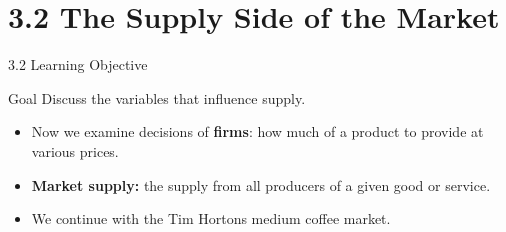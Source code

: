 \documentclass[aspectratio=169]{beamer}
\begin{document}
\section{3.2 The Supply Side of the Market}

\begin{frame}{3.2 Learning Objective}
\transfade
\begin{block}{Goal}
Discuss the variables that influence supply.
\end{block}
\begin{itemize}
  \item Now we examine decisions of \textbf{firms}: how much of a product to provide at various prices.
  \item \textbf{Market supply:} the supply from all producers of a given good or service.
  \item We continue with the Tim Hortons medium coffee market.
\end{itemize}
\end{frame}
\end{document}
